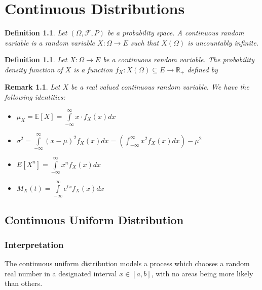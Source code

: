 \documentclass[1pt]{report}
\newtheorem{defn}[thm]{Definition}
\newtheorem{rmk}[thm]{Remark}
\newcommand{\Rone}{\mathbb{R}}
\newcommand{\R}{\Rone}
\newcommand{\<}{\langle}
\renewcommand{\>}{\rangle}
\newcommand{\FF}{\mathcal{F}}
\newcommand{\E}{\mathbb{E}}
\newcommand{\intoverr}{\int\limits_{-\infty}^\infty}
\begin{document}
\chapter{Continuous Distributions}
\begin{defn}\label{def:ctsrandomvariable}
Let $(\Omega, \FF, P)$ be a probability space. A \emph{continuous random variable} is a random variable $X: \Omega \to E$ such that $X(\Omega)$ is uncountably infinite.
\end{defn}
\begin{defn}\label{pdf}
Let $X: \Omega \to E$ be a continuous random variable. The \emph{probability density function} of $X$ is a function $f_X: X(\Omega)\subseteq E \to \R_+$ defined by 
\end{defn}
\begin{rmk}\label{rmk:ctsidentities}
Let $X$ be a real valued continuous random variable. We have the following identities:
\begin{itemize}
\item $\mu_X = \E[X] = {\displaystyle \int\limits_{-\infty}^\infty} x\cdot f_X(x) dx$
\item $\sigma^2 = {\displaystyle \int\limits_{-\infty}^\infty} (x-\mu)^2 f_X(x) dx = \left({\displaystyle \int_{-\infty}^\infty} x^2 f_X(x) dx\right) - \mu^2$
\item $E[X^n] = {\displaystyle \int\limits_{-\infty}^\infty} x^n f_X(x)dx$
\item $M_X(t) = {\displaystyle \intoverr} e^{tx}f_X(x)dx$
\end{itemize}
\end{rmk}
\newpage
\section{Continuous Uniform Distribution}
\subsection{Interpretation}
The continuous uniform distribution models a process which chooses a random real number in a designated interval $x \in [a,b]$, with no areas being more likely than others.
\end{document}
